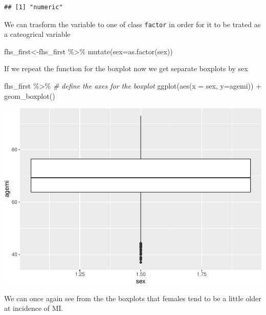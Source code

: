 \documentclass[
]{book}
\newenvironment{Shaded}{\begin{snugshade}}{\end{snugshade}}
\newcommand{\AttributeTok}[1]{\textcolor[rgb]{0.77,0.63,0.00}{#1}}
\newcommand{\CommentTok}[1]{\textcolor[rgb]{0.56,0.35,0.01}{\textit{#1}}}
\newcommand{\FunctionTok}[1]{\textcolor[rgb]{0.00,0.00,0.00}{#1}}
\newcommand{\NormalTok}[1]{#1}
\newcommand{\OtherTok}[1]{\textcolor[rgb]{0.56,0.35,0.01}{#1}}
\newcommand{\SpecialCharTok}[1]{\textcolor[rgb]{0.00,0.00,0.00}{#1}}
\begin{document}
\begin{verbatim}
## [1] "numeric"
\end{verbatim}

We can trasform the variable to one of class \texttt{factor} in order for it to be trated as a cateogrical variable

\begin{Shaded}
\begin{Highlighting}[]
\NormalTok{fhs\_first}\OtherTok{\textless{}{-}}\NormalTok{fhs\_first }\SpecialCharTok{\%\textgreater{}\%} 
\FunctionTok{mutate}\NormalTok{(}\AttributeTok{sex=}\FunctionTok{as.factor}\NormalTok{(sex))}
\end{Highlighting}
\end{Shaded}

If we repeat the function for the boxplot now we get separate boxplots by sex

\begin{Shaded}
\begin{Highlighting}[]
\NormalTok{fhs\_first }\SpecialCharTok{\%\textgreater{}\%} 
  \CommentTok{\# define the axes for the boxplot}
  \FunctionTok{ggplot}\NormalTok{(}\FunctionTok{aes}\NormalTok{(}\AttributeTok{x =}\NormalTok{ sex, }\AttributeTok{y=}\NormalTok{agemi)) }\SpecialCharTok{+} 
  \FunctionTok{geom\_boxplot}\NormalTok{()}
\end{Highlighting}
\end{Shaded}

\includegraphics{adv_epi_analysis_files/figure-latex/unnamed-chunk-141-1.pdf}

We can once again see from the the boxplots that females tend to be a little older at incidence of MI.
\end{document}
